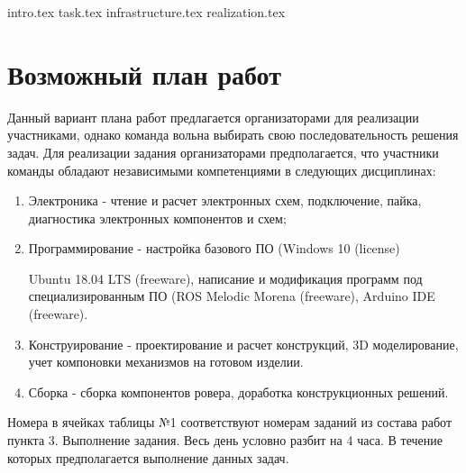{intro.tex}
{task.tex}
{infrastructure.tex}
{realization.tex}

\section{Возможный план работ}

Данный вариант плана работ предлагается организаторами для реализации участниками, однако команда вольна выбирать свою последовательность решения задач. Для реализации задания организаторами предполагается, что участники команды обладают независимыми компетенциями в следующих дисциплинах:
\begin{enumerate}
    \item Электроника - чтение и расчет электронных схем, подключение, пайка, диагностика электронных компонентов и схем; 
    \item Программирование - настройка базового ПО (Windows 10 (license)
    
    Ubuntu 18.04 LTS (freeware), написание и модификация программ под специализированным ПО (ROS Melodic Morena (freeware), Arduino IDE (freeware).
    \item Конструирование - проектирование и расчет конструкций, 3D моделирование, учет компоновки механизмов на готовом изделии.
    \item Сборка - сборка компонентов ровера, доработка конструкционных решений.
\end{enumerate}
Номера в ячейках таблицы №1 соответствуют номерам заданий из состава работ пункта 3. Выполнение задания. Весь день условно разбит на 4 часа. В течение которых предполагается выполнение данных задач.

